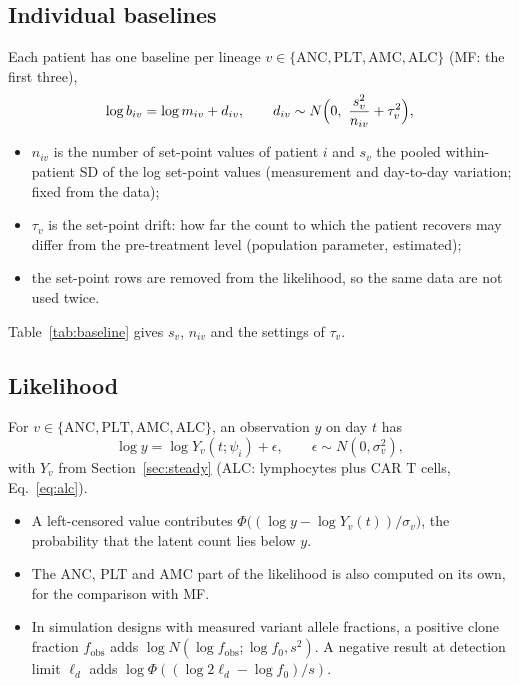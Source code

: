 \documentclass[11pt]{article}
\begin{document}
\subsection{Individual baselines}\label{sec:baseline}
Each patient has one baseline per lineage $v\in\{\mathrm{ANC},\mathrm{PLT},\mathrm{AMC},\mathrm{ALC}\}$ (MF: the first three),
\begin{equation}
\log b_{iv} = \log m_{iv} + d_{iv},\qquad d_{iv}\sim N\Bigl(0,\ \frac{s_v^2}{n_{iv}}+\tau_v^2\Bigr), \label{eq:baseprior}
\end{equation}
\begin{itemize}
\item $n_{iv}$ is the number of set-point values of patient $i$ and $s_v$ the pooled within-patient SD of the log set-point values (measurement and day-to-day variation; fixed from the data);
\item $\tau_v$ is the set-point drift: how far the count to which the patient recovers may differ from the pre-treatment level (population parameter, estimated);
\item the set-point rows are removed from the likelihood, so the same data are not used twice.
\end{itemize}
Table~\ref{tab:baseline} gives $s_v$, $n_{iv}$ and the settings of $\tau_v$.

\subsection{Likelihood}
For $v\in\{\mathrm{ANC},\mathrm{PLT},\mathrm{AMC},\mathrm{ALC}\}$, an observation $y$ on day $t$ has
\begin{equation}
\log y = \log Y_v(t;\psi_i) + \epsilon,\qquad \epsilon\sim N(0,\sigma_v^2), \label{eq:obs}
\end{equation}
with $Y_v$ from Section~\ref{sec:steady} (ALC: lymphocytes plus CAR T cells, Eq.~\ref{eq:alc}).
\begin{itemize}
\item A left-censored value contributes $\Phi\bigl((\log y-\log Y_v(t))/\sigma_v\bigr)$, the probability that the latent count lies below $y$.
\item The ANC, PLT and AMC part of the likelihood is also computed on its own, for the comparison with MF.
\item In simulation designs with measured variant allele fractions, a positive clone fraction $f_{\mathrm{obs}}$ adds $\log N(\log f_{\mathrm{obs}};\log f_0,s^2)$. A negative result at detection limit $\ell_d$ adds $\log\Phi((\log 2\ell_d-\log f_0)/s)$.
\end{itemize}
\end{document}

